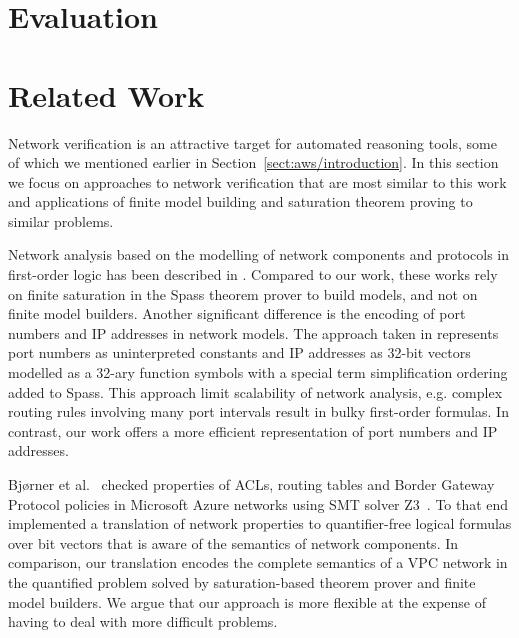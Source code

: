 \section{Evaluation}
\label{sect:aws/evaluation}


\section{Related Work}
\label{sect:aws/related}

Network verification is an attractive target for automated reasoning tools, some of which we mentioned earlier in Section~\ref{sect:aws/introduction}. In this section we focus on approaches to network verification that are most similar to this work and applications of finite model building and saturation theorem proving to similar problems.

Network analysis based on the modelling of network components and protocols in first-order logic has been described in \cite{Karl2006,Hirt2006}. Compared to our work, these works rely on finite saturation in the Spass theorem prover to build models, and not on finite model builders. Another significant difference is the encoding of port numbers and IP addresses in network models. The approach taken in \cite{Karl2006,Hirt2006} represents port numbers as uninterpreted constants and IP addresses as 32-bit vectors modelled as a 32-ary function symbols with a special term simplification ordering added to Spass. This approach limit scalability of network analysis, e.g. complex routing rules involving many port intervals result in bulky first-order formulas. In contrast, our work offers a more efficient representation of port numbers and IP addresses.

Bj\o{}rner et al.~\cite{DBLP:conf/icdcit/BjornerJ15} checked properties of ACLs, routing tables and Border Gateway Protocol policies in Microsoft Azure networks using SMT solver Z3~\cite{Z3}. To that end \cite{DBLP:conf/icdcit/BjornerJ15} implemented a translation of network properties to quantifier-free logical formulas over bit vectors that is aware of the semantics of network components. In comparison, our translation encodes the complete semantics of a VPC network in the quantified problem solved by saturation-based theorem prover and finite model builders. We argue that our approach is more flexible at the expense of having to deal with more difficult problems.

